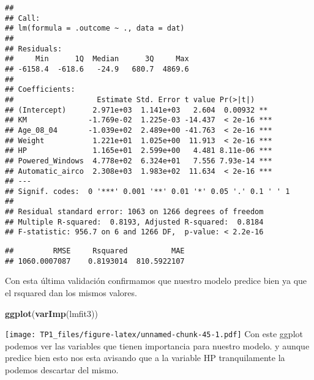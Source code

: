 \documentclass[
]{article}
\newenvironment{Shaded}{\begin{snugshade}}{\end{snugshade}}
\newcommand{\DataTypeTok}[1]{\textcolor[rgb]{0.13,0.29,0.53}{#1}}
\newcommand{\DecValTok}[1]{\textcolor[rgb]{0.00,0.00,0.81}{#1}}
\newcommand{\KeywordTok}[1]{\textcolor[rgb]{0.13,0.29,0.53}{\textbf{#1}}}
\newcommand{\NormalTok}[1]{#1}
\newcommand{\OperatorTok}[1]{\textcolor[rgb]{0.81,0.36,0.00}{\textbf{#1}}}
\newcommand{\StringTok}[1]{\textcolor[rgb]{0.31,0.60,0.02}{#1}}
\begin{document}
\begin{verbatim}
## 
## Call:
## lm(formula = .outcome ~ ., data = dat)
## 
## Residuals:
##     Min      1Q  Median      3Q     Max 
## -6158.4  -618.6   -24.9   680.7  4869.6 
## 
## Coefficients:
##                   Estimate Std. Error t value Pr(>|t|)    
## (Intercept)      2.971e+03  1.141e+03   2.604  0.00932 ** 
## KM              -1.769e-02  1.225e-03 -14.437  < 2e-16 ***
## Age_08_04       -1.039e+02  2.489e+00 -41.763  < 2e-16 ***
## Weight           1.221e+01  1.025e+00  11.913  < 2e-16 ***
## HP               1.165e+01  2.599e+00   4.481 8.11e-06 ***
## Powered_Windows  4.778e+02  6.324e+01   7.556 7.93e-14 ***
## Automatic_airco  2.308e+03  1.983e+02  11.634  < 2e-16 ***
## ---
## Signif. codes:  0 '***' 0.001 '**' 0.01 '*' 0.05 '.' 0.1 ' ' 1
## 
## Residual standard error: 1063 on 1266 degrees of freedom
## Multiple R-squared:  0.8193, Adjusted R-squared:  0.8184 
## F-statistic: 956.7 on 6 and 1266 DF,  p-value: < 2.2e-16
\end{verbatim}

\begin{Shaded}
\end{Shaded}

\begin{verbatim}
##         RMSE     Rsquared          MAE 
## 1060.0007087    0.8193014  810.5922107
\end{verbatim}

Con esta última validación confirmamos que nuestro modelo predice bien
ya que el rsquared dan los mismos valores.

\begin{Shaded}
\begin{Highlighting}[]
\KeywordTok{ggplot}\NormalTok{(}\KeywordTok{varImp}\NormalTok{(lmfit3))}
\end{Highlighting}
\end{Shaded}

\texttt{[image: TP1\_files/figure-latex/unnamed-chunk-45-1.pdf]} Con este
ggplot podemos ver las variables que tienen importancia para nuestro
modelo. y aunque predice bien esto nos esta avisando que a la variable
HP tranquilamente la podemos descartar del mismo.
\end{document}
